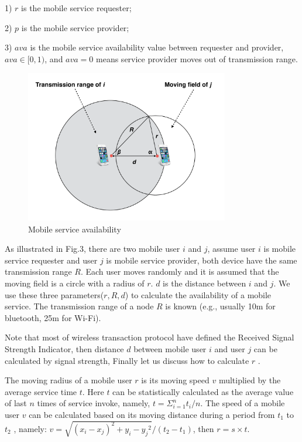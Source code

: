 \documentclass[10pt,journal,compsoc]{IEEEtran}
\begin{document}
​1) $r$ is the mobile service requester;

​2) $p$ is the mobile service provider;

​3) $ava$ is the mobile service availability value between requester and provider, $ava \in [0,1)$, and $ava=0$ means service provider moves out of transmission range.


\begin{figure}[!t]
\centering
\includegraphics[width=3.5in]{./img/pic3.pdf}
\caption{Mobile service availability}
\label{fig_sd}
\end{figure}

As illustrated in Fig.3, there are two mobile user $i$ and $j$, assume user $i$ is mobile service requester and user $j$ is mobile service provider, both device have the same transmission range $R$. Each user moves randomly and it is assumed that the moving field is a circle with a radius of $r$. $d$ is the distance between $i$ and $j$. We use these three parameters($r,R,d$) to calculate the availability of a mobile service. The transmission range of a node $R$ is known (e.g., usually 10m for bluetooth, 25m for Wi-Fi). 

Note that most of wireless transaction protocol have defined the Received Signal Strength Indicator, then distance $d$ between mobile user $i$ and user $j$ can be calculated by signal strength, Finally let us discuss how to calculate $r$ \cite{Yang2010}.


The moving radius of a mobile user $r$ is its moving speed $v$ multiplied by the average service time $t$. Here $t$ can be statistically calculated as the average value of last $n$ times of service invoke, namely, $t = \Sigma_{i=1}^{n}t_i/n$. The speed of a mobile user $v$ can be calculated based on its moving distance during a period from $t_1$ to $t_2$ \cite{ko2000location}, namely: $v = \sqrt{{(x_i-x_j)^2}+{y_i-y_j}^2}/(t_2-t_1)$, then $r = s \times t$.
\end{document}
